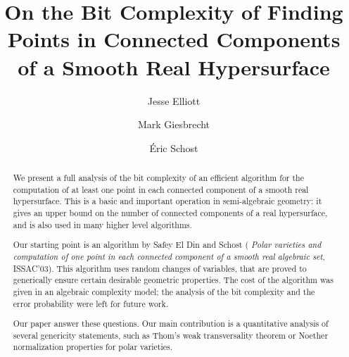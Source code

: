 \documentclass[sigconf]{acmart}
\begin{document}
\title{On the Bit Complexity of Finding Points in Connected Components of a Smooth Real Hypersurface}

\author{Jesse Elliott}

\author{Mark Giesbrecht}

\author{\'Eric Schost}
\renewcommand{\shortauthors}{Elliott, Giesbrecht, and Schost.}

\begin{abstract}
  We present a full analysis of the bit complexity of an efficient
  algorithm for the computation of at least one point in each
  connected component of a smooth real hypersurface. This is a basic
  and important operation in semi-algebraic geometry: it gives an
  upper bound on the number of connected components of a real
  hypersurface, and is also used in many higher level algorithms.
  
  Our starting point is an algorithm by Safey El Din and Schost ({\em
    Polar varieties and computation of one point in each connected
    component of a smooth real algebraic set}, ISSAC'03). This
  algorithm uses random changes of variables, that are proved to
  generically ensure certain desirable geometric properties. The
  cost of the algorithm was given in an algebraic complexity
  model; the analysis of the bit complexity and the error probability
  were left for future work.

  Our paper answer these questions. Our main contribution is a
  quantitative analysis of several genericity statements, such as
  Thom's weak transversality theorem or Noether normalization
  properties for polar varieties.
\end{abstract}
\end{document}
